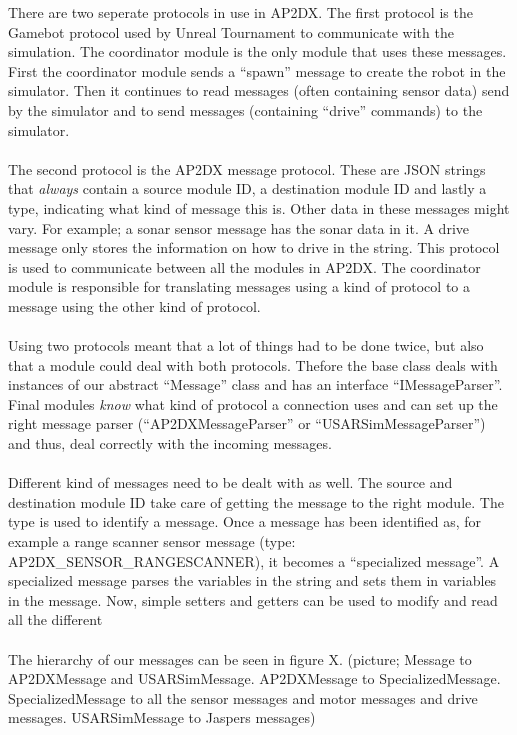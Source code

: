 There are two seperate protocols in use in AP2DX. The first protocol is the Gamebot protocol 
used by Unreal Tournament to communicate with the simulation. The coordinator module is the 
only module that uses these messages. First the coordinator module sends a ``spawn'' message 
to create the robot in the simulator. Then it continues to read messages (often containing 
sensor data) send by the simulator and to send messages (containing ``drive'' commands) to
the simulator. 
\\\\
The second protocol is the AP2DX message protocol. These are JSON strings that \emph{always}
contain a source module ID, a destination module ID and lastly a type, indicating what kind
of message this is. Other data in these messages might vary. For example; a sonar sensor
message has the sonar data in it. A drive message only stores the information on how to drive
in the string. 
This protocol is used to communicate between all the modules in 
AP2DX.  The coordinator module is responsible for translating messages using a kind of
protocol to a message using the other kind of protocol.
\\\\
Using two protocols meant that a lot of things had to be done twice, but also that a module 
could deal with both protocols. Thefore the 
base class deals with instances
of our abstract ``Message'' class and has an interface ``IMessageParser''. Final modules \emph{know}
what kind of protocol a connection uses and can set up the right message parser (``AP2DXMessageParser'' 
or ``USARSimMessageParser'') and thus, deal correctly with the incoming messages. 
\\\\
Different kind of messages need to be dealt with as well. The source and destination module ID take care
of getting the message to the right module. The type is used to identify a message. Once a message
has been identified as, for example a range scanner sensor message (type: AP2DX\_SENSOR\_RANGESCANNER), 
it becomes a ``specialized message''. 
A specialized message parses the variables in the string and sets them in variables in the message. Now,
simple setters and getters can be used to modify and read all the different 
\\\\
The hierarchy of our messages can be seen in figure X. 
(picture; Message to AP2DXMessage and USARSimMessage. AP2DXMessage to SpecializedMessage. SpecializedMessage
to all the sensor messages and motor messages and drive messages. USARSimMessage to Jaspers messages) 


